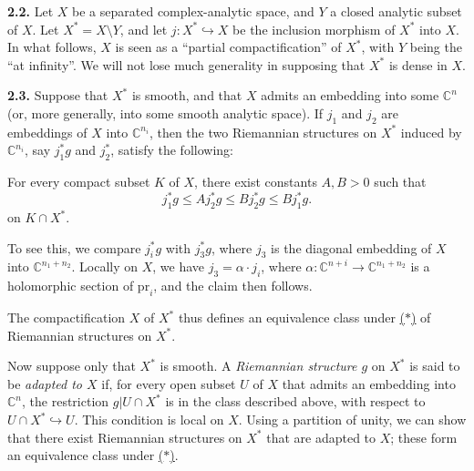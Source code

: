 \documentclass{report}
\newenvironment{itenv*}
  {\phantomsection\par\medskip\noindent\itshape}
  {\par\medskip}
\newenvironment{rmenv}[1]
  {\phantomsection\par\medskip\noindent\textbf{#1.}\rmfamily}
  {\par\medskip}
\newcommand{\CC}{\mathbb{C}}
\newcommand{\pr}{\mathrm{pr}}
\renewcommand{\leq}{\leqslant}
\newcommand{\oldpage}[1]{\marginpar{\footnotesize$\Big\vert$ \textit{p.~#1}}}
\begin{document}
\oldpage{61}
\begin{rmenv}{2.2}
\label{II.2.2}
  Let $X$ be a separated complex-analytic space, and $Y$ a closed analytic subset of $X$.
  Let $X^*=X\setminus Y$, and let $j\colon X^*\hookrightarrow X$ be the inclusion morphism of $X^*$ into $X$.
  In what follows, $X$ is seen as a ``partial compactification'' of $X^*$, with $Y$ being the ``at infinity''.
  We will not lose much generality in supposing that $X^*$ is dense in $X$.
\end{rmenv}

\begin{rmenv}{2.3}
\label{II.2.3}
  Suppose that $X^*$ is smooth, and that $X$ admits an embedding into some $\CC^n$ (or, more generally, into some smooth analytic space).
  If $j_1$ and $j_2$ are embeddings of $X$ into $\CC^{n_i}$, then the two Riemannian structures on $X^*$ induced by $\CC^{n_i}$, say $j_1^*g$ and $j_2^*$, satisfy the following:

  \begin{itenv*}
  \label{II.2.3.*}
    For every compact subset $K$ of $X$, there exist constants $A,B>0$ such that
    \[
      j_1^*g \leq Aj_2^*g \leq Bj_2^*g \leq Bj_1^*g.
    \tag{$*$}
    \]
    on $K\cap X^*$.
  \end{itenv*}

  To see this, we compare $j_i^*g$ with $j_3^*g$, where $j_3$ is the diagonal embedding of $X$ into $\CC^{n_1+n_2}$.
  Locally on $X$, we have $j_3=\alpha\cdot j_i$, where $\alpha\colon\CC^{n+i}\to\CC^{n_1+n_2}$ is a holomorphic section of $\pr_i$, and the claim then follows.

  The compactification $X$ of $X^*$ thus defines an equivalence class under \hyperref[II.2.3.*]{($*$)} of Riemannian structures on $X^*$.

  Now suppose only that $X^*$ is smooth.
  A \emph{Riemannian structure $g$} on $X^*$ is said to be \emph{adapted to $X$} if, for every open subset $U$ of $X$ that admits an embedding into $\CC^n$, the restriction $g|U\cap X^*$ is in the class described above, with respect to $U\cap X^*\hookrightarrow U$.
  This condition is local on $X$.
  Using a partition of unity, we can show that there exist Riemannian structures on $X^*$ that are adapted to $X$;
  these form an equivalence class under \hyperref[II.2.3.*]{($*$)}.
\end{rmenv}
\end{document}

